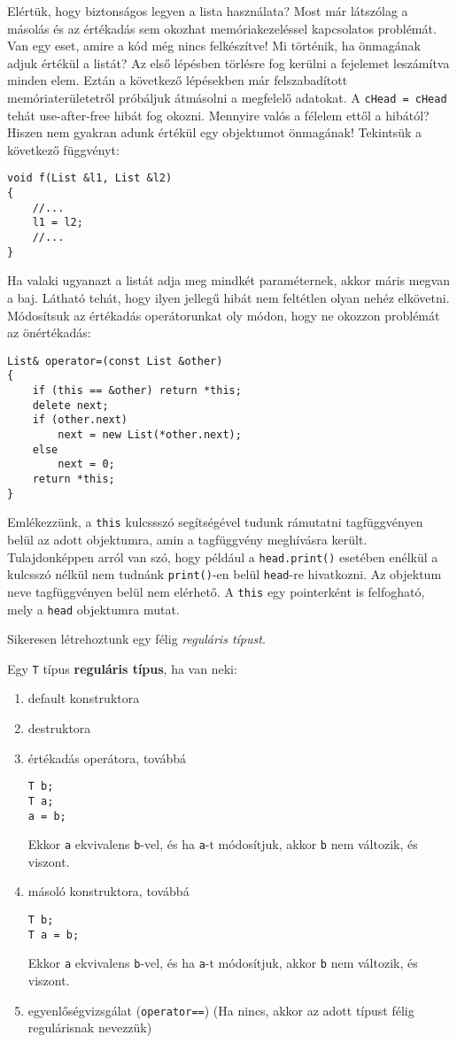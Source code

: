 \documentclass[a4paper,11.5pt,table]{article}
\begin{document}
	Elértük, hogy biztonságos legyen a lista használata? Most már látszólag a másolás és az értékadás sem okozhat memóriakezeléssel kapcsolatos problémát. Van egy eset, amire a kód még nincs felkészítve! Mi történik, ha önmagának adjuk értékül a listát? Az első lépésben törlésre fog kerülni a fejelemet leszámítva minden elem. Eztán a következő lépésekben már felszabadított memóriaterületetről próbáljuk átmásolni a megfelelő adatokat. A \texttt{cHead = cHead} tehát use-after-free hibát fog okozni. Mennyire valós a félelem ettől a hibától? Hiszen nem gyakran adunk értékül egy objektumot önmagának! Tekintsük a következő függvényt:
	\begin{lstlisting}
void f(List &l1, List &l2)
{
	//...
	l1 = l2;
	//...
}
	\end{lstlisting}
	Ha valaki ugyanazt a listát adja meg mindkét paraméternek, akkor máris megvan a baj. Látható tehát, hogy ilyen jellegű hibát nem feltétlen olyan nehéz elkövetni.  Módosítsuk az értékadás operátorunkat oly módon, hogy ne okozzon problémát az önértékadás:
\begin{lstlisting}
List& operator=(const List &other)
{
	if (this == &other) return *this;
	delete next;
	if (other.next)
		next = new List(*other.next);
	else
		next = 0;
	return *this;
}
\end{lstlisting}
  Emlékezzünk, a \texttt{this} kulcssszó segítségével tudunk rámutatni tagfüggvényen belül az adott objektumra, amin a tagfüggvény meghívásra került. Tulajdonképpen arról van szó, hogy például a \texttt{head.print()} esetében enélkül a kulcsszó nélkül nem tudnánk \texttt{print()}-en belül \texttt{head}-re hivatkozni. Az objektum neve tagfüggvényen belül nem elérhető. A \texttt{this} egy pointerként is felfogható, mely a \texttt{head} objektumra mutat.
	\medskip

	Sikeresen létrehoztunk egy félig \textit{reguláris típust}.
	\medskip
	
	Egy \texttt{T} típus \textbf{reguláris típus}, ha van neki:
	\begin{enumerate}
		\item default konstruktora
		\item destruktora
		\item értékadás operátora, továbbá
		\begin{lstlisting}
T b;
T a;
a = b;
		\end{lstlisting}
		Ekkor \texttt{a} ekvivalens \texttt{b}-vel, és ha \texttt{a}-t módosítjuk, akkor \texttt{b} nem változik, és viszont.
		\item másoló konstruktora, továbbá
		\begin{lstlisting}
T b;
T a = b;
		\end{lstlisting}
		Ekkor \texttt{a} ekvivalens \texttt{b}-vel, és ha \texttt{a}-t módosítjuk, akkor \texttt{b} nem változik, és viszont.
		\item egyenlőségvizsgálat (\texttt{operator==}) (Ha nincs, akkor az adott típust félig regulárisnak nevezzük)
	\end{enumerate}
\end{document}
